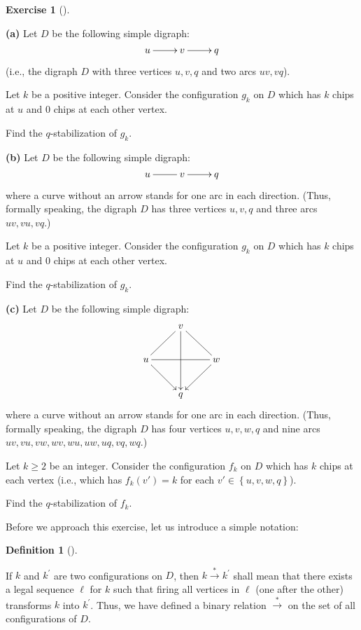 \documentclass[numbers=enddot,12pt,final,onecolumn,notitlepage]{scrartcl}%
\makeatletter
\newcounter{exer}
\theoremstyle{definition}
\newtheorem{defi}[theo]{Definition}
\newenvironment{definition}[1][]
{\begin{defi}[#1]\begin{leftbar}}
{\end{leftbar}\end{defi}}
\newtheorem{exmp}[exer]{Exercise}
\newenvironment{exercise}[1][]
{\begin{exmp}[#1]\begin{leftbar}}
{\end{leftbar}\end{exmp}}
\newcommand{\set}[1]{\left\{ #1 \right\}}
\newcommand{\tup}[1]{\left( #1 \right)}
\newcommand{\are}{\ar@{-}}
\makeatother
\begin{document}
\Needspace{15cm}
\begin{exercise} \label{exe.chip.examples}
\textbf{(a)} Let $D$ be the following simple digraph:
\[
\xymatrix{
 u \ar[r] & v \ar[r] & q
}
\]
(i.e., the digraph $D$ with three vertices
$u, v, q$ and two arcs $uv, vq$).

Let $k$ be a positive integer.
Consider the configuration $g_k$ on $D$ which has $k$ chips at $u$
and $0$ chips at each other vertex.

Find the $q$-stabilization of $g_k$.

\textbf{(b)} Let $D$ be the following simple digraph:
\[
\xymatrix{
 u \are[r] & v \ar[r] & q
}
\]
where a curve without an arrow stands for one arc in each
direction.
(Thus, formally speaking, the digraph $D$ has three vertices
$u, v, q$ and three arcs $uv, vu, vq$.)

Let $k$ be a positive integer.
Consider the configuration $g_k$ on $D$ which has $k$ chips at $u$
and $0$ chips at each other vertex.

Find the $q$-stabilization of $g_k$.

\textbf{(c)} Let $D$ be the following simple digraph:
\[
\xymatrix{
 & v \are[dl] \are[dr] \ar[dd] \\
 u \are[rr] \ar[dr] & & w \ar[dl] \\
 & q
}
\]
where a curve without an arrow stands for one arc in each
direction.
(Thus, formally speaking, the digraph $D$ has four vertices
$u, v, w, q$ and nine arcs
$uv, vu, vw, wv, wu, uw, uq, vq, wq$.)

Let $k \geq 2$ be an integer.
Consider the configuration $f_k$ on $D$ which has $k$ chips at each
vertex (i.e., which has $f_k \tup{v'} = k$ for each
$v' \in \set{u, v, w, q}$).

Find the $q$-stabilization of $f_k$.
\end{exercise}

Before we approach this exercise, let us introduce a simple notation:

\begin{definition}
\label{def.firearrow}If $k$ and $k^{\prime}$ are two configurations on $D$,
then $k\overset{\ast}{\rightarrow}k^{\prime}$ shall mean that there exists a
legal sequence $\ell$ for $k$ such that firing all vertices in $\ell$ (one
after the other) transforms $k$ into $k^{\prime}$. Thus, we have defined a
binary relation $\overset{\ast}{\rightarrow}$ on the set of all configurations
of $D$.
\end{definition}
\end{document}

